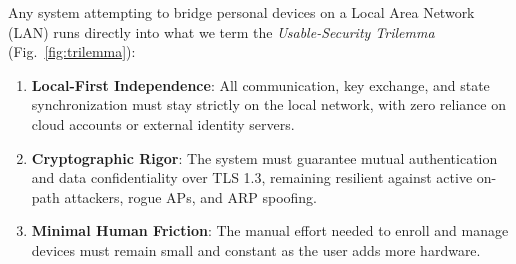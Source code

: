 \documentclass[conference]{IEEEtran}
\begin{document}
Any system attempting to bridge personal devices on a Local Area Network (LAN) runs directly into what we term the \textit{Usable-Security Trilemma} (Fig.~\ref{fig:trilemma}):
\begin{enumerate}
    \item \textbf{Local-First Independence}: All communication, key exchange, and state synchronization must stay strictly on the local network, with zero reliance on cloud accounts or external identity servers.
    \item \textbf{Cryptographic Rigor}: The system must guarantee mutual authentication and data confidentiality over TLS 1.3, remaining resilient against active on-path attackers, rogue APs, and ARP spoofing.
    \item \textbf{Minimal Human Friction}: The manual effort needed to enroll and manage devices must remain small and constant as the user adds more hardware.
\end{enumerate}
\end{document}
